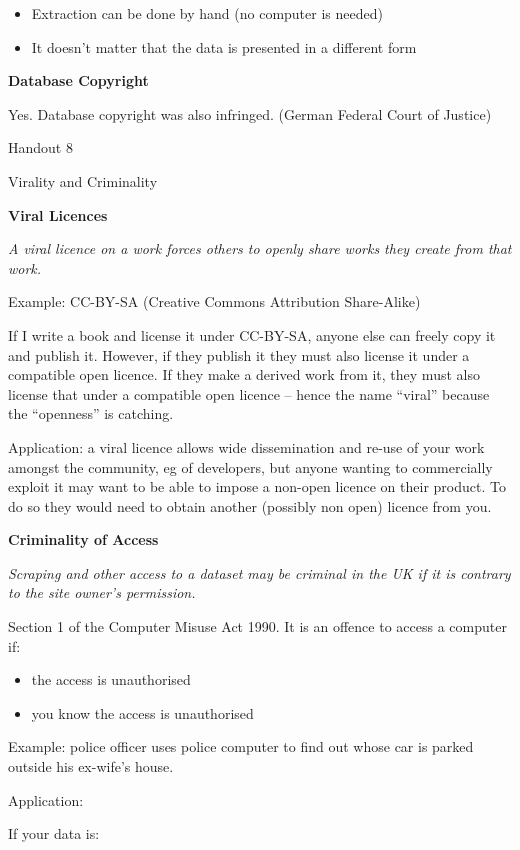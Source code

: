 \begin{itemize}
\item
  Extraction can be done by hand (no computer is needed)
\item
  It doesn't matter that the data is presented in a different form
\end{itemize}

\textbf{Database Copyright}

Yes. Database copyright was also infringed. (German Federal Court of
Justice)

Handout 8

Virality and Criminality

\textbf{Viral Licences}

\emph{A viral licence on a work forces others to openly share works they
create from that work.}

Example: CC-BY-SA (Creative Commons Attribution Share-Alike)

If I write a book and license it under CC-BY-SA, anyone else can freely
copy it and publish it. However, if they publish it they must also
license it under a compatible open licence. If they make a derived work
from it, they must also license that under a compatible open licence --
hence the name ``viral'' because the ``openness'' is catching.

Application: a viral licence allows wide dissemination and re-use of
your work amongst the community, eg of developers, but anyone wanting to
commercially exploit it may want to be able to impose a non-open licence
on their product. To do so they would need to obtain another (possibly
non open) licence from you.

\textbf{Criminality of Access}

\emph{Scraping and other access to a dataset may be criminal in the UK
if it is contrary to the site owner's permission.}

Section 1 of the Computer Misuse Act 1990. It is an offence to access a
computer if:

\begin{itemize}
\item
  the access is unauthorised
\item
  you know the access is unauthorised
\end{itemize}

Example: police officer uses police computer to find out whose car is
parked outside his ex-wife's house.

Application:

If your data is:

